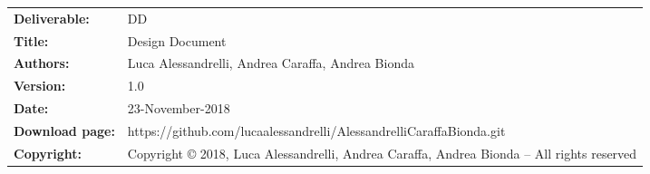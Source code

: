 \begin{table}[h!]
\begin{tabu} to \textwidth { X[0.3,r,p] X[0.7,l,p] }
\hline

\textbf{Deliverable:} & DD\\
\textbf{Title:} & Design Document \\
\textbf{Authors:} & Luca Alessandrelli, Andrea Caraffa, Andrea Bionda \\
\textbf{Version:} & 1.0 \\ 
\textbf{Date:} & 23-November-2018 \\
\textbf{Download page:} & https://github.com/lucaalessandrelli/AlessandrelliCaraffaBionda.git \\
\textbf{Copyright:} & Copyright © 2018, Luca Alessandrelli, Andrea Caraffa, Andrea Bionda – All rights reserved \\
\hline
\end{tabu}
\end{table}




\setcounter{page}{2}


\newpage
{}
\tableofcontents
\newpage

\clearpage
{}
\label{sect:introduction}


\clearpage
{}
\label{sect:architecturaldesign}


\clearpage
{}
\label{sect:uidesign}


